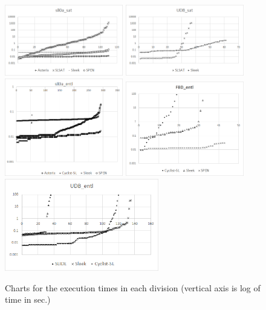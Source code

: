 \documentclass[twoside,11pt]{article}
\begin{document}
\begin{figure}
\begin{center}
\includegraphics[width=0.46\textwidth]{sll0a_sat.png}
\includegraphics[width=0.46\textwidth]{UDB_sat.png}
\includegraphics[width=0.46\textwidth]{sll0a_entl.png}
\includegraphics[width=0.46\textwidth]{FDB_entl.png}
\includegraphics[width=0.6\textwidth]{UDB_entl.png}
\end{center}
\caption{Charts for the execution times in each division (vertical axis is log of time in sec.)}
\label{fig:charts}
\end{figure}
\end{document}

